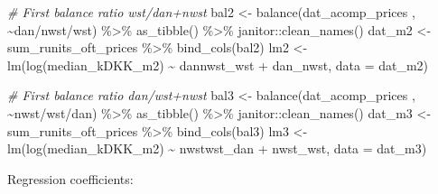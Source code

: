 \documentclass[
  12pt,
]{article}
\newenvironment{Shaded}{\begin{snugshade}}{\end{snugshade}}
\newcommand{\AttributeTok}[1]{\textcolor[rgb]{0.77,0.63,0.00}{#1}}
\newcommand{\CommentTok}[1]{\textcolor[rgb]{0.56,0.35,0.01}{\textit{#1}}}
\newcommand{\FunctionTok}[1]{\textcolor[rgb]{0.00,0.00,0.00}{#1}}
\newcommand{\NormalTok}[1]{#1}
\newcommand{\OtherTok}[1]{\textcolor[rgb]{0.56,0.35,0.01}{#1}}
\newcommand{\SpecialCharTok}[1]{\textcolor[rgb]{0.00,0.00,0.00}{#1}}
\begin{document}
\begin{Shaded}
\begin{Highlighting}[]
\CommentTok{\# First balance ratio wst/dan+nwst}
\NormalTok{bal2   }\OtherTok{\textless{}{-}} \FunctionTok{balance}\NormalTok{(dat\_acomp\_prices , }\SpecialCharTok{\textasciitilde{}}\NormalTok{dan}\SpecialCharTok{/}\NormalTok{nwst}\SpecialCharTok{/}\NormalTok{wst) }\SpecialCharTok{\%\textgreater{}\%} \FunctionTok{as\_tibble}\NormalTok{() }\SpecialCharTok{\%\textgreater{}\%}\NormalTok{ janitor}\SpecialCharTok{::}\FunctionTok{clean\_names}\NormalTok{()}
\NormalTok{dat\_m2 }\OtherTok{\textless{}{-}}\NormalTok{ sum\_runits\_oft\_prices  }\SpecialCharTok{\%\textgreater{}\%} \FunctionTok{bind\_cols}\NormalTok{(bal2)}
\NormalTok{lm2    }\OtherTok{\textless{}{-}} \FunctionTok{lm}\NormalTok{(}\FunctionTok{log}\NormalTok{(median\_kDKK\_m2) }\SpecialCharTok{\textasciitilde{}}\NormalTok{ dannwst\_wst  }\SpecialCharTok{+}\NormalTok{ dan\_nwst, }\AttributeTok{data =}\NormalTok{ dat\_m2)}

\CommentTok{\# First balance ratio dan/wst+nwst}
\NormalTok{bal3   }\OtherTok{\textless{}{-}} \FunctionTok{balance}\NormalTok{(dat\_acomp\_prices , }\SpecialCharTok{\textasciitilde{}}\NormalTok{nwst}\SpecialCharTok{/}\NormalTok{wst}\SpecialCharTok{/}\NormalTok{dan) }\SpecialCharTok{\%\textgreater{}\%} \FunctionTok{as\_tibble}\NormalTok{() }\SpecialCharTok{\%\textgreater{}\%}\NormalTok{ janitor}\SpecialCharTok{::}\FunctionTok{clean\_names}\NormalTok{()}
\NormalTok{dat\_m3 }\OtherTok{\textless{}{-}}\NormalTok{ sum\_runits\_oft\_prices  }\SpecialCharTok{\%\textgreater{}\%} \FunctionTok{bind\_cols}\NormalTok{(bal3)}
\NormalTok{lm3    }\OtherTok{\textless{}{-}} \FunctionTok{lm}\NormalTok{(}\FunctionTok{log}\NormalTok{(median\_kDKK\_m2) }\SpecialCharTok{\textasciitilde{}}\NormalTok{ nwstwst\_dan  }\SpecialCharTok{+}\NormalTok{ nwst\_wst, }\AttributeTok{data =}\NormalTok{ dat\_m3)}
\end{Highlighting}
\end{Shaded}

Regression coefficients:
\end{document}
